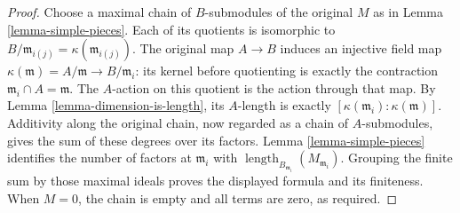 \begin{proof}
Choose a maximal chain of $B$-submodules of the original $M$
as in Lemma \ref{lemma-simple-pieces}. Each of its quotients is
isomorphic to $B/\mathfrak m_{i(j)}=\kappa(\mathfrak m_{i(j)})$.
The original map $A\to B$ induces an injective field map
$\kappa(\mathfrak m)=A/\mathfrak m\to B/\mathfrak m_i$:
its kernel before quotienting is exactly the contraction
$\mathfrak m_i\cap A=\mathfrak m$.
The $A$-action on this quotient is the action through that map.
By Lemma \ref{lemma-dimension-is-length}, its $A$-length is
exactly $[\kappa(\mathfrak m_i):\kappa(\mathfrak m)]$.
Additivity along the original chain, now regarded as a chain
of $A$-submodules, gives the sum of these degrees over its factors.
Lemma \ref{lemma-simple-pieces} identifies the number of factors
at $\mathfrak m_i$ with
$\operatorname{length}_{B_{\mathfrak m_i}}(M_{\mathfrak m_i})$.
Grouping the finite sum by those maximal ideals proves the
displayed formula and its finiteness. When $M=0$, the chain
is empty and all terms are zero, as required.


\end{proof}

